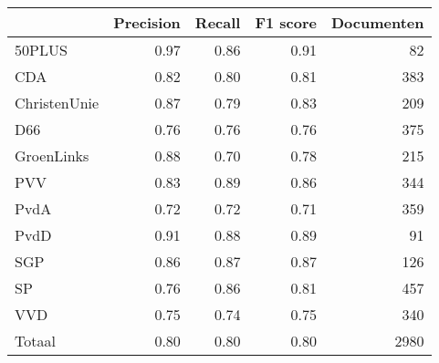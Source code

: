 \begin{tabular}{lrrrr}
\toprule
{} &  Precision &  Recall &  F1 score &  Documenten \\
\midrule
50PLUS       &       0.97 &    0.86 &      0.91 &          82 \\
CDA          &       0.82 &    0.80 &      0.81 &         383 \\
ChristenUnie &       0.87 &    0.79 &      0.83 &         209 \\
D66          &       0.76 &    0.76 &      0.76 &         375 \\
GroenLinks   &       0.88 &    0.70 &      0.78 &         215 \\
PVV          &       0.83 &    0.89 &      0.86 &         344 \\
PvdA         &       0.72 &    0.72 &      0.71 &         359 \\
PvdD         &       0.91 &    0.88 &      0.89 &          91 \\
SGP          &       0.86 &    0.87 &      0.87 &         126 \\
SP           &       0.76 &    0.86 &      0.81 &         457 \\
VVD          &       0.75 &    0.74 &      0.75 &         340 \\
Totaal       &       0.80 &    0.80 &      0.80 &        2980 \\
\bottomrule
\end{tabular}
